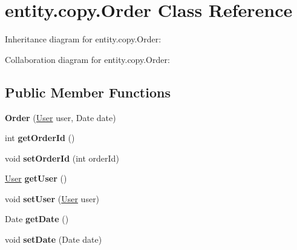 \hypertarget{classentity_1_1copy_1_1_order}{}\section{entity.\+copy.\+Order Class Reference}
\label{classentity_1_1copy_1_1_order}


Inheritance diagram for entity.\+copy.\+Order\+:


Collaboration diagram for entity.\+copy.\+Order\+:
\subsection*{Public Member Functions}
\begin{DoxyCompactItemize}
\item 
\mbox{\label{classentity_1_1copy_1_1_order_aee666f6da3c8bb8cfe4ce3699aa7fce2}} 
{\bfseries Order} (\mbox{\hyperlink{classentity_1_1copy_1_1_user}{User}} user, Date date)
\item 
\mbox{\label{classentity_1_1copy_1_1_order_af2ac4a03d75f6dce4f224a1728dab6f0}} 
int {\bfseries get\+Order\+Id} ()
\item 
\mbox{\label{classentity_1_1copy_1_1_order_ad9a5ee04f79b8c74569a76d529122e4f}} 
void {\bfseries set\+Order\+Id} (int order\+Id)
\item 
\mbox{\label{classentity_1_1copy_1_1_order_ab47f88a27fae5d395ef0d5464b686e65}} 
\mbox{\hyperlink{classentity_1_1copy_1_1_user}{User}} {\bfseries get\+User} ()
\item 
\mbox{\label{classentity_1_1copy_1_1_order_a7820d3309c881e54099ea477ea1dd4cf}} 
void {\bfseries set\+User} (\mbox{\hyperlink{classentity_1_1copy_1_1_user}{User}} user)
\item 
\mbox{\label{classentity_1_1copy_1_1_order_a0c3568ec65e20efd5357ecdb37899d01}} 
Date {\bfseries get\+Date} ()
\item 
\mbox{\label{classentity_1_1copy_1_1_order_a91aa08696dcbde232e8f700ee1371dd3}} 
void {\bfseries set\+Date} (Date date)
\end{DoxyCompactItemize}


